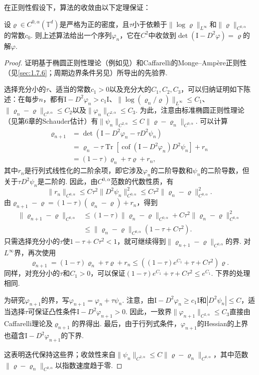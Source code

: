 在正则性假设下，算法的收敛由以下定理保证：
\begin{theorem}\label{obj:6.4}
设$\varrho\in C^{0,\alpha}(\mathbb T^d)$是严格为正的密度，且$\tau$小于依赖于$\|\log\varrho\|_{L^\infty}$和$\|\varrho\|_{C^{0,\alpha}}$的常数$c_0$. 则上述算法给出一个序列$\varphi_n$，它在$C^2$中收敛到$\det(\mathrm I-D^2\varphi)=\varrho$的解$\varphi$.
\end{theorem}
\begin{proof}
证明基于椭圆正则性理论（例如见\cite{b184}）和Caffarelli的Monge--Ampère正则性（见\autoref{sec:1.7.6}；周期边界条件另见\cite{b127}）所导出的先验界.

选择充分小的$\tau$、适当的常数$c_1>0$以及充分大的$C_1,C_2,C_3$，可以归纳证明如下陈述：在每步$n$，都有$\mathrm I-D^2\varphi_n>c_1\mathrm I$、$\|\log(\varrho_n/\varrho)\|_{L^\infty}\le C_1$、$\|\varrho_n-\varrho\|_{C^{0,\alpha}}\le C_2$以及$\|\varphi_n\|_{C^{2,\alpha}}\le C_3$. 为此，注意由标准椭圆正则性理论（见\cite{b184}第6章的Schauder估计）有$\|\psi_n\|_{C^{2,\alpha}}\le C\|\varrho-\varrho_n\|_{C^{0,\alpha}}$. 可以计算
\[
\begin{aligned}
\varrho_{n+1}
&=\det(\mathrm I-D^2\varphi_n-\tau D^2\psi_n)\\
&=\varrho_n-\tau\operatorname{Tr}[
\operatorname{cof}(\mathrm I-D^2\varphi_n)D^2\psi_n]+r_n\\
&=(1-\tau)\varrho_n+\tau\varrho+r_n,
\end{aligned}
\]
其中$r_n$是行列式线性化的二阶余项，即它涉及$\varphi_n$的二阶导数和$\psi_n$的二阶导数，但关于$\tau D^2\psi_n$是二阶的. 因此，由$C^{0,\alpha}$范数的代数性质，有
\[
\|r_n\|_{C^{0,\alpha}}\le C\tau^2\|D^2\psi_n\|_{C^{0,\alpha}}^2
\le C\tau^2\|\varrho_n-\varrho\|_{C^{0,\alpha}}^2.
\]
由$\varrho_{n+1}-\varrho=(1-\tau)(\varrho_n-\varrho)+r_n$，得到
\[
\begin{aligned}
\|\varrho_{n+1}-\varrho\|_{C^{0,\alpha}}
&\le(1-\tau)\|\varrho_n-\varrho\|_{C^{0,\alpha}}
+C\tau^2\|\varrho_n-\varrho\|_{C^{0,\alpha}}^2\\
&\le\|\varrho_n-\varrho\|_{C^{0,\alpha}}(1-\tau+C\tau^2).
\end{aligned}
\]
只需选择充分小的$\tau$使$1-\tau+C\tau^2<1$，就可继续得到$\|\varrho_{n+1}-\varrho\|_{C^{0,\alpha}}$的界. 对$L^\infty$界，再次使用
\[
\varrho_{n+1}=(1-\tau)\varrho_n+\tau\varrho+r_n
\le((1-\tau)e^{C_1}+\tau+C\tau^2)\varrho.
\]
同样，对充分小的$\tau$和$C_1>0$，可以保证$(1-\tau)e^{C_1}+\tau+C\tau^2\le e^{C_1}$. 下界的处理相同.

为研究$\varphi_{n+1}$的界，写$\varphi_{n+1}=\varphi_n+\tau\psi_n$. 注意，由$\mathrm I-D^2\varphi_n\ge c_1\mathrm I$和$|D^2\psi_n|\le C$，适当选择$\tau$可保证凸性条件$\mathrm I-D^2\varphi_{n+1}>0$. 因此，一致界$\|\varphi_{n+1}\|_{C^{2,\alpha}}\le C_3$直接由Caffarelli理论及$\varrho_{n+1}$的界得出. 最后，由于行列式条件，$\varphi_{n+1}$的Hessian的上界也蕴含$\mathrm I-D^2\varphi_{n+1}$的下界.

这表明迭代保持这些界；收敛性来自$\|\psi_n\|_{C^{2,\alpha}}\le C\|\varrho-\varrho_n\|_{C^{0,\alpha}}$，其中范数$\|\varrho-\varrho_n\|_{C^{0,\alpha}}$以指数速度趋于零.
\end{proof}

